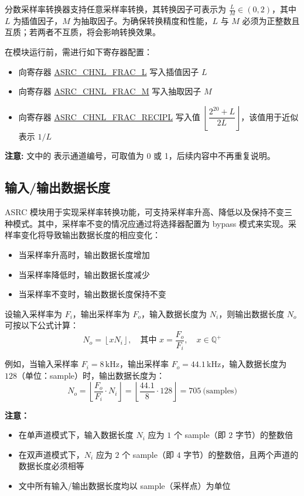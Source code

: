 \documentclass[main\_\_CN.tex]{subfiles}
\begin{document}
分数采样率转换器支持任意采样率转换，其转换因子可表示为 $\frac{L}{M} \in (0, 2)$，其中 $L$ 为插值因子，$M$ 为抽取因子。为确保转换精度和性能，$L$ 与 $M$ 必须为正整数且互质；若两者不互质，将会影响转换效果。

在模块运行前，需进行如下寄存器配置：

\begin{itemize}
  \item 向寄存器 \hyperref[fielddesc:ASRCCHNL0FRACL]{ASRC\_CHNL\_FRAC\_L} 写入插值因子 $L$
  \item 向寄存器 \hyperref[fielddesc:ASRCCHNL0FRACM]{ASRC\_CHNL\_FRAC\_M} 写入抽取因子 $M$
  \item 向寄存器 \hyperref[fielddesc:ASRCCHNL0FRACRECIPL]{ASRC\_CHNL\_FRAC\_RECIPL} 写入值 $\left\lfloor \dfrac{2^{20} + L}{2L} \right\rfloor$，该值用于近似表示 $1/L$
\end{itemize}

\textbf{注意:} 文中的  表示通道编号，可取值为 0 或 1，后续内容中不再重复说明。

\subsection{输入/输出数据长度}
\label{subsec:input-output-len}

ASRC 模块用于实现采样率转换功能，可支持采样率升高、降低以及保持不变三种模式。其中，采样率不变的情况应通过将选择器配置为 bypass 模式来实现。采样率变化将导致输出数据长度的相应变化：

\begin{itemize}
  \item 当采样率升高时，输出数据长度增加
  \item 当采样率降低时，输出数据长度减少
  \item 当采样率不变时，输出数据长度保持不变
\end{itemize}

设输入采样率为 $F_i$，输出采样率为 $F_o$，输入数据长度为 $N_i$，则输出数据长度 $N_o$ 可按以下公式计算：
\[
N_o = \left\lfloor x N_i \right\rfloor, \quad \text{其中 } x = \frac{F_o}{F_i}, \quad x \in \mathbb{Q}^+
\]

例如，当输入采样率 $F_i = 8\,\mathrm{kHz}$，输出采样率 $F_o = 44.1\,\mathrm{kHz}$，输入数据长度为 $128$（单位：sample）时，输出数据长度为：
\[
N_o = \left\lfloor \frac{F_o}{F_i} \cdot N_i \right\rfloor = \left\lfloor \frac{44.1}{8} \cdot 128 \right\rfloor = 705\ \text{(samples)}
\]


\textbf{注意：}
\begin{itemize}
  \item 在单声道模式下，输入数据长度 $N_i$ 应为 $1$ 个 sample（即 $2$ 字节）的整数倍
  \item 在双声道模式下，$N_i$ 应为 $2$ 个 sample（即 $4$ 字节）的整数倍，且两个声道的数据长度必须相等
  \item 文中所有输入/输出数据长度均以 sample（采样点）为单位
\end{itemize}
\end{document}
